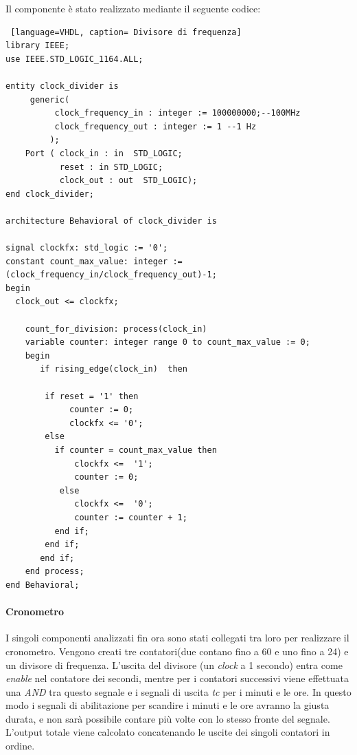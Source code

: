 Il componente è stato realizzato mediante il seguente codice:
\begin{lstlisting} [language=VHDL, caption= Divisore di frequenza]
library IEEE;
use IEEE.STD_LOGIC_1164.ALL;
 
entity clock_divider is
     generic(
          clock_frequency_in : integer := 100000000;--100MHz
          clock_frequency_out : integer := 1 --1 Hz
         );
    Port ( clock_in : in  STD_LOGIC;
           reset : in STD_LOGIC;
           clock_out : out  STD_LOGIC);
end clock_divider;
 
architecture Behavioral of clock_divider is
 
signal clockfx: std_logic := '0';
constant count_max_value: integer := (clock_frequency_in/clock_frequency_out)-1;
begin
  clock_out <= clockfx;
 
    count_for_division: process(clock_in)
    variable counter: integer range 0 to count_max_value := 0;
    begin
       if rising_edge(clock_in)  then
       
        if reset = '1' then
             counter := 0;
             clockfx <= '0';
        else
          if counter = count_max_value then
              clockfx <=  '1';
              counter := 0;
           else
              clockfx <=  '0';
              counter := counter + 1;
          end if;
        end if;
       end if;
    end process;
end Behavioral;
\end{lstlisting}

\paragraph{Cronometro}
I singoli componenti analizzati fin ora sono stati collegati tra loro per realizzare il cronometro. Vengono creati tre contatori(due contano fino a 60 e uno fino a 24) e un divisore di frequenza. L'uscita del divisore (un \textit{clock} a 1 secondo) entra come \textit{enable} nel contatore dei secondi, mentre per i contatori successivi viene effettuata una \textit{AND} tra questo segnale e i segnali di uscita \textit{tc} per i minuti e le ore. In questo modo i segnali di abilitazione per scandire i minuti e le ore avranno la giusta durata, e non sarà possibile contare più volte con lo stesso fronte del segnale.
L'output totale viene calcolato concatenando le uscite dei singoli contatori in ordine.

